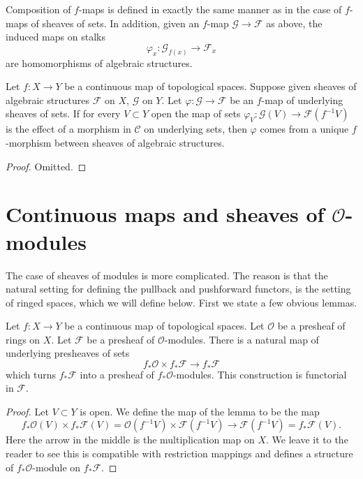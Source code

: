 \medskip\noindent
Composition of $f$-maps is defined in exactly the
same manner as in the case of $f$-maps of sheaves of
sets. In addition, given an $f$-map $\mathcal{G} \to \mathcal{F}$
as above, the induced maps on stalks
$$
\varphi_x : \mathcal{G}_{f(x)} \longrightarrow \mathcal{F}_x
$$
are homomorphisms of algebraic structures.


\begin{lemma}
\label{lemma-f-map-sets-algebraic-structures}
Let $f : X \to Y$ be a continuous map of topological spaces.
Suppose given sheaves of algebraic structures
$\mathcal{F}$ on $X$, $\mathcal{G}$ on $Y$. Let
$\varphi : \mathcal{G} \to \mathcal{F}$ be an $f$-map
of underlying sheaves of sets. If for every $V \subset Y$ open the
map of sets $\varphi_V : \mathcal{G}(V) \to \mathcal{F}(f^{-1}V)$ 
is the effect of a morphism in $\mathcal{C}$ on underlying sets,
then $\varphi$ comes from a unique $f$-morphism between
sheaves of algebraic structures.
\end{lemma}

\begin{proof}
Omitted.
\end{proof}




\section{Continuous maps and sheaves of $\mathcal{O}$-modules}
\label{section-presheaves-modules-functorial}

\noindent
The case of sheaves of modules is more complicated.
The reason is that the natural setting for defining
the pullback and pushforward functors, is the setting
of ringed spaces, which we will define below. First
we state a few obvious lemmas.

\begin{lemma}
\label{lemma-pushforward-presheaf-module}
Let $f : X \to Y$ be a continuous map of topological spaces.
Let $\mathcal{O}$ be a presheaf of rings on $X$. Let
$\mathcal{F}$ be a presheaf of $\mathcal{O}$-modules.
There is a natural map of underlying presheaves of sets
$$
f_*\mathcal{O} \times f_*\mathcal{F}
\longrightarrow
f_*\mathcal{F}
$$
which turns $f_*\mathcal{F}$ into a presheaf of
$f_*\mathcal{O}$-modules. This construction is
functorial in $\mathcal{F}$.
\end{lemma}

\begin{proof}
Let $V \subset Y$ is open. We define the map of the lemma
to be the map
$$
f_*\mathcal{O}(V) \times f_*\mathcal{F}(V)
=
\mathcal{O}(f^{-1}V) \times \mathcal{F}(f^{-1}V)
\to
\mathcal{F}(f^{-1}V)
=
f_*\mathcal{F}(V).
$$
Here the arrow in the middle is the multiplication map on $X$.
We leave it to the reader to see this is compatible with
restriction mappings and defines a structure of
$f_*\mathcal{O}$-module on $f_*\mathcal{F}$.
\end{proof}

